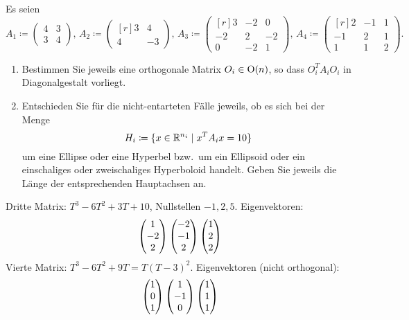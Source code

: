 \documentclass[a4paper, 10pt]{scrartcl}
\begin{document}
\begin{question}
  Es seien
  \[
    A_1
    \coloneqq
    \begin{pmatrix}
      4 & 3 \\
      3 & 4
    \end{pmatrix},
    \,
    A_2
    \coloneqq
    \begin{pmatrix*}[r]
      3 &  4  \\
      4 & -3
    \end{pmatrix*},
    \,
    A_3
    \coloneqq
    \begin{pmatrix*}[r]
       3  & -2  &  0  \\
      -2  &  2  & -2  \\
       0  & -2  &  1
    \end{pmatrix*},
    \,
    A_4
    \coloneqq
    \begin{pmatrix*}[r]
       2  & -1  & 1 \\
      -1  &  2  & 1 \\
       1  &  1  & 2
    \end{pmatrix*}.
  \]
  \begin{enumerate}[leftmargin=*]
    \item
      Bestimmen Sie jeweils eine orthogonale Matrix $O_i \in \mathrm{O}(n)$, so dass $O_i^T A_i O_i$ in Diagonalgestalt vorliegt.
    \item
      Entschieden Sie für die nicht-entarteten Fälle jeweils, ob es sich bei der Menge
      \[
        H_i \coloneqq \{ x \in \mathbb{R}^{n_i} \mid x^T A_i x = 10 \}
      \]
      um eine Ellipse oder eine Hyperbel bzw.\ um ein Ellipsoid oder ein einschaliges oder zweischaliges Hyperboloid handelt.
      Geben Sie jeweils die Länge der entsprechenden Hauptachsen an.
  \end{enumerate}
\end{question}


\begin{solution}
  Dritte Matrix: $T^3 - 6 T^2 + 3 T + 10$, Nullstellen $-1, 2, 5$.
  Eigenvektoren:
  \[
    \begin{pmatrix} 1 \\ -2 \\ 2 \end{pmatrix}
    \begin{pmatrix} -2 \\ -1 \\ 2 \end{pmatrix}
    \begin{pmatrix} 1 \\ 2 \\ 2 \end{pmatrix}
  \]
  Vierte Matrix: $T^3 - 6 T^2 + 9 T = T(T-3)^2$.
  Eigenvektoren (nicht orthogonal):
  \[
    \begin{pmatrix} 1 \\  0 \\ 1 \end{pmatrix}
    \begin{pmatrix} 1 \\ -1 \\ 0 \end{pmatrix}
    \begin{pmatrix} 1 \\  1 \\ 1 \end{pmatrix}
  \]

\end{solution}
\end{document}

